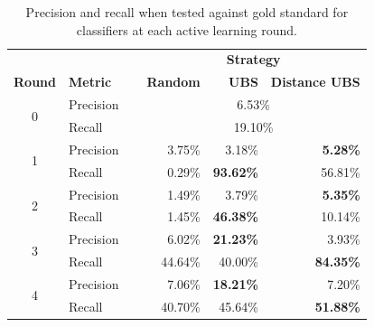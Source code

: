 \begin{table}[ht!]
\centering
\caption{Precision and recall when tested against gold standard for classifiers at each active learning round.\label{tab:pr_table}
}
\vspace{2ex}
\setlength\tabcolsep{6pt}
\begin{tabular}{|c| l | r | r | r |}
\hline
& & \multicolumn{3}{c|}{\textbf{Strategy}} \\
 \textbf{Round} & \textbf{Metric} & \textbf{Random} & \textbf{UBS}  & \textbf{Distance UBS}  \\
\hline
\multirow{2}{*}{0} & Precision &        \multicolumn{3}{c|}{6.53\%} \\
 & Recall\ \ \ \ \ &               \multicolumn{3}{c|}{19.10\%} \\
\hline
\multirow{2}{*}{1}  & Precision     & 3.75\%       &      3.18\%      &  \textbf{5.28\%} \\
 & Recall\ \ \ \ \ & 0.29\%      &   \textbf{93.62\%}     &  56.81\% \\
\hline
\multirow{2}{*}{2} & Precision      & 1.49\%           &      3.79\%      &  \textbf{5.35\%} \\
& Recall\ \ \ \ \ & 1.45\%           &    \textbf{46.38\%}      &  10.14\% \\
\hline
\multirow{2}{*}{3}  & Precision      & 6.02\%              &    \textbf{21.23\%}      &  3.93\% \\
 & Recall\ \ \ \ \ & 44.64\%            &    40.00\%      &  \textbf{84.35\%}  \\
\hline
\multirow{2}{*}{4} & Precision     & 7.06\%          &    \textbf{18.21\%}      &  7.20\% \\
& Recall\ \ \ \ \ & 40.70\%         &     45.64\%     &  \textbf{51.88\%} \\
\hline
\end{tabular}
\end{table}

